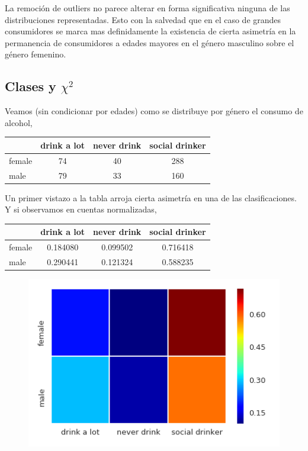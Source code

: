 \documentclass[8pt]{beamer}
\begin{document}
\begin{frame}
\begin{multicols}{2}
\begin{figure}
 \end{figure}
 \end{multicols}
 \small{La remoción de outliers no parece alterar en forma significativa ninguna de las distribuciones representadas. Esto con la salvedad que en el caso de grandes consumidores se marca mas definidamente la existencia de cierta asimetría en la permanencia de consumidores a edades mayores en el género masculino sobre el género femenino.} 
\end{frame}

\subsection{Clases y $\chi^2$ }
\begin{frame}
Veamos (sin condicionar por edades) como se distribuye por género el consumo de alcohol,
\tiny{
\begin{table}
\begin{tabular}{lccc}
\toprule
{} &  drink a lot &  never drink &  social drinker \\
\midrule
female &           74 &           40 &             288 \\
male   &           79 &           33 &             160 \\
\bottomrule
\end{tabular}
\end{table} 
}
\small{Un primer vistazo a la tabla arroja cierta asimetría en una de las clasificaciones. Y si observamos en cuentas normalizadas,}
\tiny{
\begin{table}
\begin{tabular}{lccc}
\toprule
{} &  drink a lot &  never drink &  social drinker \\
\midrule
female &     0.184080 &     0.099502 &        0.716418 \\
male   &     0.290441 &     0.121324 &        0.588235 \\
\bottomrule
\end{tabular}
\end{table} 
}
%
\begin{multicols}{2}
  \begin{figure}
 \includegraphics[scale=0.3]{alcohol_heatmap}

\end{figure}
\end{multicols}
\end{frame}
\end{document}
